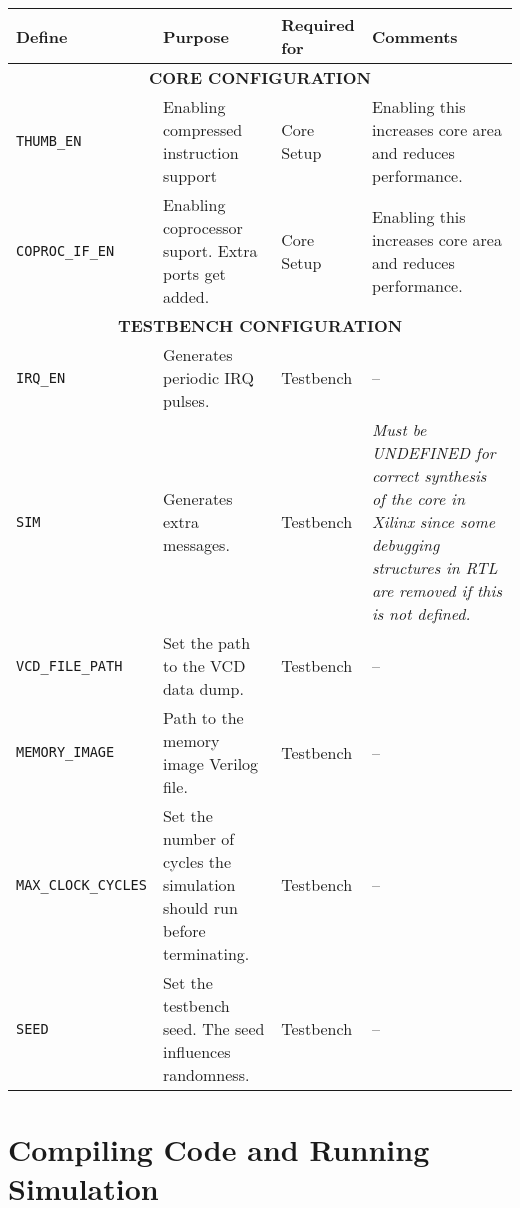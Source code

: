 \documentclass[11pt]{article}
\begin{document}
\begin{tabularx}{\textwidth}{| X | X | X | X |} 
 \hline
 \textbf{Define} & \textbf{Purpose} & \textbf{Required} for & \textbf{Comments} 
\\  
 \hline
         \multicolumn{4}{c}{\textbf{CORE CONFIGURATION}} \\
 \hline

 \texttt{THUMB\_EN} & Enabling compressed instruction support & Core Setup & 
 Enabling this increases core area and reduces performance. \\ 

 \texttt{COPROC\_IF\_EN} & Enabling coprocessor suport. Extra ports get added. &
  Core Setup & Enabling this increases core area and reduces performance. \\

 \hline
         \multicolumn{4}{c}{\textbf{TESTBENCH CONFIGURATION}} \\
 \hline

 \texttt{IRQ\_EN} & Generates periodic IRQ pulses. & Testbench & -- \\

 \texttt{SIM} & Generates extra messages. & Testbench & \emph{Must be UNDEFINED 
 for correct synthesis of the core in Xilinx since some debugging structures
in RTL are removed if this is not defined.} \\

 \texttt{VCD\_FILE\_PATH} & Set the path to the VCD data dump. & Testbench & -- \\

 \texttt{MEMORY\_IMAGE} & Path to the memory image Verilog file. & Testbench & 
 -- \\

 \texttt{MAX\_CLOCK\_CYCLES} & Set the number of cycles the simulation should 
 run before terminating. & Testbench & -- \\

 \texttt{SEED} & Set the testbench seed. The seed influences randomness. & 
 Testbench & -- \\

\hline
\end{tabularx}


\pagebreak
\section{Compiling Code and Running Simulation}
\end{document}
